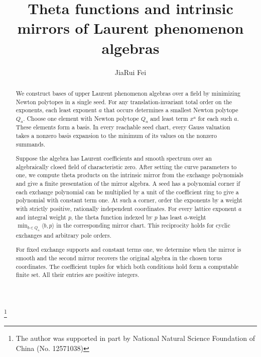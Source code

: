 \documentclass[11pt,reqno]{amsart}
\numberwithin{equation}{section}
\theoremstyle{definition}
\theoremstyle{remark}
\begin{document}
	
\title[Theta functions for LP algebras]{Theta functions and intrinsic mirrors of Laurent phenomenon algebras}
\author{JiaRui Fei}
\address{School of Mathematical Sciences, Shanghai Jiao Tong University, China}
\thanks{The author was supported in part by National Natural Science Foundation of China (No. 12571038)}

\date{}
\dedicatory{}

\begin{abstract}
We construct bases of upper Laurent phenomenon algebras over a field
by minimizing Newton polytopes in a single seed. For any
translation-invariant total order on the exponents, each least exponent
\(a\) that occurs determines a smallest Newton polytope \(Q_a\).
Choose one element with Newton polytope \(Q_a\) and least term \(x^a\)
for each such \(a\). These elements form a basis. In every reachable
seed chart, every Gauss valuation takes a nonzero basis expansion to the
minimum of its values on the nonzero summands.

Suppose the algebra has Laurent coefficients and smooth spectrum over
an algebraically closed field of characteristic zero. After setting the
curve parameters to one, we compute theta products on the intrinsic
mirror from the exchange polynomials and give a finite presentation of
the mirror algebra. A seed has a polynomial corner if each
exchange polynomial can be multiplied by a unit of the coefficient ring
to give a polynomial with constant term one. At such a corner, order
the exponents by a weight with strictly positive, rationally independent
coordinates. For every lattice exponent \(a\) and integral weight \(p\),
the theta function indexed by \(p\) has least \(a\)-weight
\(\min_{b\in Q_a}\langle b,p\rangle\) in the corresponding mirror chart.
This reciprocity holds for cyclic exchanges and arbitrary pole orders.

For fixed exchange supports and constant terms one, we determine when
the mirror is smooth and the second mirror recovers the original algebra
in the chosen torus coordinates. The coefficient tuples for which both
conditions hold form a computable finite set. All their entries are positive integers.
\end{abstract}
\maketitle
\setcounter{tocdepth}{1}
{\linespread{0.89}\selectfont\tableofcontents}
\clearpage
\end{document}
